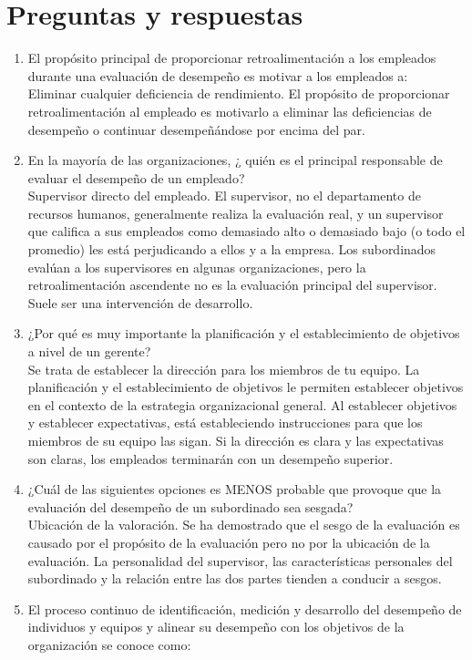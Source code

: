 \documentclass[10pt]{book}
\begin{document}
\section{Preguntas y respuestas}
\begin{enumerate}[\bfseries 1.]
\item El propósito principal de proporcionar retroalimentación a los empleados durante una evaluación de desempeño es motivar a los empleados a:\\
Eliminar cualquier deficiencia de rendimiento. El propósito de proporcionar retroalimentación al empleado es motivarlo a eliminar las deficiencias de desempeño o continuar desempeñándose por encima del par.
\item En la mayoría de las organizaciones, ¿ quién es el principal responsable de evaluar el desempeño de un empleado? \\
Supervisor directo del empleado. El supervisor, no el departamento de recursos humanos, generalmente realiza la evaluación real, y un supervisor que califica a sus empleados como demasiado alto o demasiado bajo (o todo el promedio) les está perjudicando a ellos y a la empresa. Los subordinados evalúan a los supervisores en algunas organizaciones, pero la retroalimentación ascendente no es la evaluación principal del supervisor. Suele ser una intervención de desarrollo.
\item ¿Por qué es muy importante la planificación y el establecimiento de objetivos a nivel de un gerente? \\
Se trata de establecer la dirección para los miembros de tu equipo. La planificación y el establecimiento de objetivos le permiten establecer objetivos en el contexto de la estrategia organizacional general. Al establecer objetivos y establecer expectativas, está estableciendo instrucciones para que los miembros de su equipo las sigan. Si la dirección es clara y las expectativas son claras, los empleados terminarán con un desempeño superior.
\item ¿Cuál de las siguientes opciones es MENOS probable que provoque que la evaluación del desempeño de un subordinado sea sesgada? \\ 
Ubicación de la valoración. Se ha demostrado que el sesgo de la evaluación es causado por el propósito de la evaluación pero no por la ubicación de la evaluación. La personalidad del supervisor, las características personales del subordinado y la relación entre las dos partes tienden a conducir a sesgos.
\item El proceso continuo de identificación, medición y desarrollo del desempeño de individuos y equipos y alinear su desempeño con los objetivos de la organización se conoce como:\\

\end{enumerate}
\end{document}
